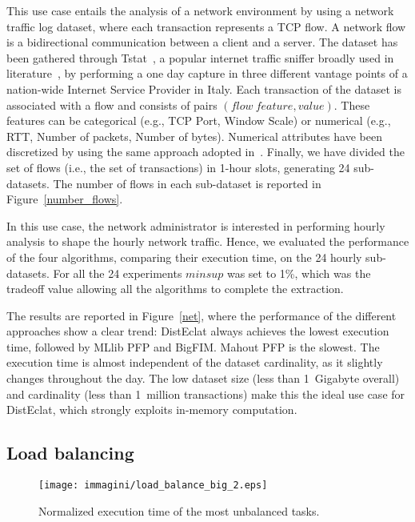 This use case entails the analysis of a network environment by
using a network traffic log dataset, where each transaction represents a TCP flow.
A network flow is a bidirectional communication between a client and a server.
The dataset has been gathered through Tstat~\cite{Tstat,Tstat2}, a popular
internet traffic sniffer broadly used in
literature~\cite{giordano2015youlighter,ApilettiBCCG13},
by performing a one day capture in three different vantage points
of a nation-wide Internet Service Provider in Italy.
Each transaction of the dataset is associated with
a flow and consists of pairs $(flow~feature, value)$. These features can be
categorical (e.g., TCP Port, Window Scale) or numerical (e.g., RTT,
Number of packets, Number of bytes). Numerical attributes have been discretized by using the same
approach adopted in~\cite{ApilettiBCCG13}.
Finally, we have divided the set of flows (i.e., the set of transactions)
in 1-hour slots, generating 24 sub-datasets.
The number of flows in each sub-dataset
is reported in Figure~\ref{number_flows}.

In this use case, the network administrator is interested in performing hourly
analysis to shape the hourly network traffic.
Hence, we evaluated the performance of the four algorithms,
comparing their execution time, on the 24 hourly sub-datasets.
For all the 24 experiments $minsup$ was set to 1\%, which was
the tradeoff value allowing all the algorithms to complete the extraction.

The results are reported in Figure~\ref{net}, where the performance of the
different approaches show a clear trend: DistEclat always achieves the
lowest execution time, followed by MLlib PFP and BigFIM.
Mahout PFP is the slowest.
The execution time is almost independent of the dataset cardinality,
as it slightly changes throughout the day.
The low dataset size (less than 1~Gigabyte overall)
and cardinality (less than 1~million transactions) make this the ideal
use case for DistEclat, which strongly exploits in-memory computation.



\subsection{Load balancing}
\label{load_exp}


\begin{figure*}[!t]
\begin{center}
\texttt{[image: immagini/load\_balance\_big\_2.eps]}
\caption{Normalized execution time of the most unbalanced tasks.}
\label{load_balance_big}
\end{center}
\end{figure*}

